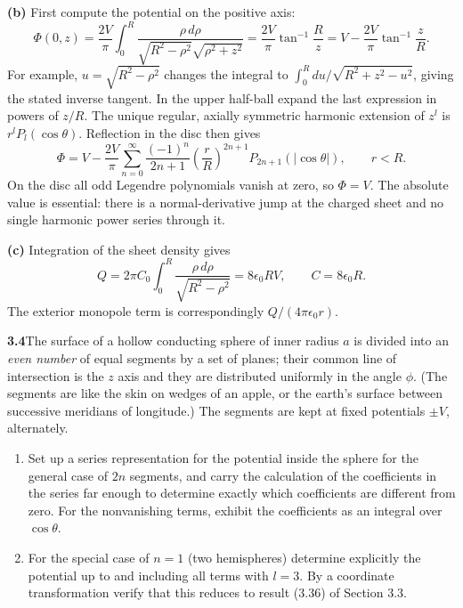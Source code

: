 \textbf{(b)} First compute the potential on the positive axis:
\[
\Phi(0,z)=\frac{2V}{\pi}\int_0^R
\frac{\rho\,d\rho}{\sqrt{R^2-\rho^2}\sqrt{\rho^2+z^2}}
=\frac{2V}{\pi}\tan^{-1}\frac Rz
=V-\frac{2V}{\pi}\tan^{-1}\frac zR.
\]
For example, $u=\sqrt{R^2-\rho^2}$ changes the integral to
$\int_0^Rdu/\sqrt{R^2+z^2-u^2}$, giving the stated inverse tangent.
In the upper half-ball expand the last expression in powers of $z/R$.
The unique regular, axially symmetric harmonic extension of $z^l$ is
$r^lP_l(\cos\theta)$.  Reflection in the disc then gives
\[
\boxed{\Phi=V-\frac{2V}{\pi}\sum_{n=0}^\infty
\frac{(-1)^n}{2n+1}\left(\frac rR\right)^{2n+1}
P_{2n+1}(|\cos\theta|),\qquad r<R.}
\]
On the disc all odd Legendre polynomials vanish at zero, so $\Phi=V$.
The absolute value is essential: there is a normal-derivative jump at
the charged sheet and no single harmonic power series through it.

\textbf{(c)} Integration of the sheet density gives
\[
Q=2\pi C_0\int_0^R\frac{\rho\,d\rho}{\sqrt{R^2-\rho^2}}
=8\epsilon_0RV,\qquad \boxed{C=8\epsilon_0R.}
\]
The exterior monopole term is correspondingly $Q/(4\pi\epsilon_0r)$.

\par\bigskip
\noindent\textbf{3.4}\quad The surface of a hollow conducting sphere of inner radius $a$ is divided into an \emph{even number} of equal segments by a set of planes; their common line of intersection is the $z$ axis and they are distributed uniformly in the angle $\phi$. (The segments are like the skin on wedges of an apple, or the earth's surface between successive meridians of longitude.) The segments are kept at fixed potentials $\pm V$, alternately.
\begin{enumerate}
\item[(a)] Set up a series representation for the potential inside the sphere for the general case of $2n$ segments, and carry the calculation of the coefficients in the series far enough to determine exactly which coefficients are different from zero. For the nonvanishing terms, exhibit the coefficients as an integral over $\cos\theta$.
\item[(b)] For the special case of $n=1$ (two hemispheres) determine explicitly the potential up to and including all terms with $l=3$. By a coordinate transformation verify that this reduces to result (3.36) of Section 3.3.
\end{enumerate}
\solution

